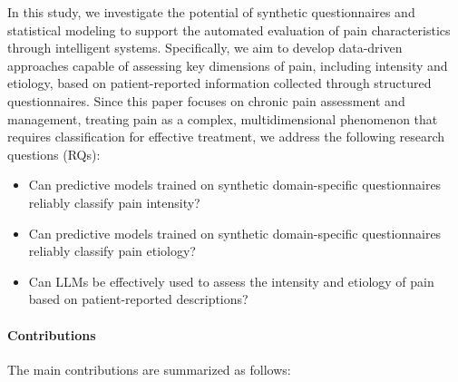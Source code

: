 \documentclass[preprint,12pt,authoryear]{elsarticle}
\begin{document}
In this study, we investigate the potential of synthetic questionnaires and statistical modeling to support the automated evaluation of pain characteristics through intelligent systems. Specifically, we aim to develop data-driven approaches capable of assessing key dimensions of pain, including intensity and etiology, based on patient-reported information collected through structured questionnaires. 
Since this paper focuses on chronic pain assessment and management, treating pain as a complex, multidimensional phenomenon that requires classification for effective treatment, we address the following research questions (RQs):

\begin{itemize}
\item[RQ1:] Can predictive models trained on synthetic domain-specific questionnaires reliably classify pain intensity?

\item[RQ2:] Can predictive models trained on synthetic domain-specific questionnaires reliably classify pain etiology?

\item[RQ3:] Can LLMs be effectively used to assess the intensity and etiology of pain based on patient-reported descriptions?

\end{itemize}

\paragraph{Contributions} The main contributions are summarized as follows:
\end{document}
